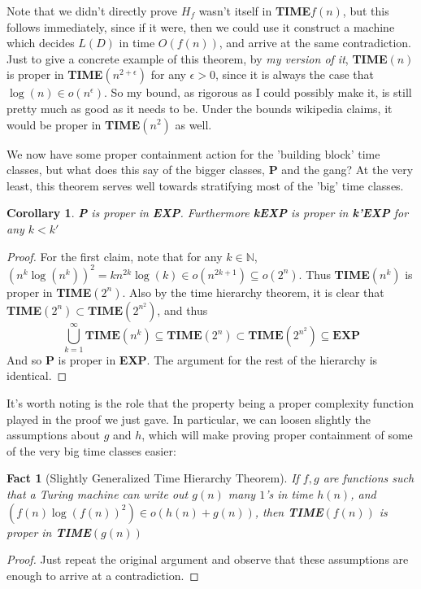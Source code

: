 \documentclass{article}
\theoremstyle{definition}
\theoremstyle{plain}
\theoremstyle{theorem}
\newtheorem{fact}{Fact}[section]
\newtheorem{corollary}{Corollary}[section]
\begin{document}
Note that we didn't directly prove $H_f$ wasn't itself in \textbf{TIME}$f(n)$, but this follows immediately, since if it were, then we could use it construct a machine which decides $L(D)$ in time $O(f(n))$, and arrive at the same contradiction. Just to give a concrete example of this theorem, by \textit{my version of it}, \textbf{TIME}$(n)$ is proper in \textbf{TIME}$(n^{2+\epsilon})$ for any $\epsilon > 0$, since it is always the case that $\log(n) \in o(n^{\epsilon})$. So my bound, as rigorous as I could possibly make it, is still pretty much as good as it needs to be. Under the bounds wikipedia claims, it would be proper in \textbf{TIME}$(n^2)$ as well.
\par We now have some proper containment action for the 'building block' time classes, but what does this say of the bigger classes, \textbf{P} and the gang? At the very least, this theorem serves well towards stratifying most of the 'big' time classes.
\begin{corollary}
	\textbf{P} is proper in \textbf{EXP}. Furthermore \textbf{kEXP} is proper in \textbf{k'EXP} for any $k < k'$
\end{corollary} 
\begin{proof}
	For the first claim, note that for any $k \in \mathbb{N}$, $(n^k\log(n^k))^2 = kn^{2k}\log(k) \in o(n^{2k+1}) \subseteq o(2^n)$. Thus \textbf{TIME}$(n^k)$ is proper in \textbf{TIME}$(2^n)$. Also by the time hierarchy theorem, it is clear that \textbf{TIME}$(2^n) \subset \textbf{TIME}(2^{n^2})$, and thus 
	\[ \bigcup_{k=1}^{\infty} \textbf{TIME}(n^k) \subseteq \textbf{TIME}(2^n) \subset \textbf{TIME}(2^{n^2}) \subseteq \textbf{EXP} \]
	And so \textbf{P} is proper in \textbf{EXP}. The argument for the rest of the hierarchy is identical.
\end{proof}
\par It's worth noting is the role that the property being a proper complexity function played in the proof we just gave. In particular, we can loosen slightly the assumptions about $g$ and $h$, which will make proving proper containment of some of the very big time classes easier:
\begin{fact}[Slightly Generalized Time Hierarchy Theorem]
	If $f,g$ are functions such that a Turing machine can write out $g(n)$ many $1$'s in time $h(n)$, and $(f(n)\log(f(n))^2) \in o(h(n)+g(n))$, then \textbf{TIME}$(f(n))$ is proper in \textbf{TIME}$(g(n))$
\end{fact}
\begin{proof}
	Just repeat the original argument and observe that these assumptions are enough to arrive at a contradiction.
\end{proof}
\end{document}
